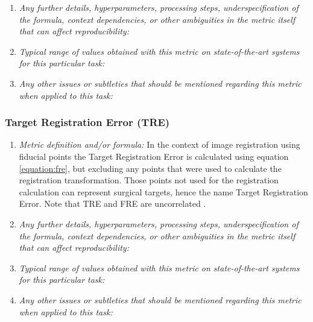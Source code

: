 \documentclass[a4paper,11pt]{article}
\begin{document}
\begin{enumerate}[label=\alph*.]
                \bigskip
                \item \textit{Any further details, hyperparameters, processing steps, underspecification of the formula, context dependencies, or other ambiguities in the metric itself that can affect reproducibility:}
                \bigskip
                \item \textit{Typical range of values obtained with this metric on state-of-the-art systems for this particular task:}
                \bigskip
                \item \textit{Any other issues or subtleties that should be mentioned regarding this metric when applied to this task:}
                \bigskip
            \end{enumerate}

        \subsubsection{Target Registration Error (TRE)}
            \begin{enumerate}[label=\alph*.]
                \item \textit{Metric definition and/or formula:}
                In the context of image registration using fiducial points the Target Registration Error is calculated using equation \ref{equation:fre}, but excluding any points that were used to calculate the registration transformation. Those points not used for the registration calculation can represent surgical targets, hence the name Target Registration Error. Note that TRE and FRE are uncorrelated \cite{fitzpatrick2009fiducial}.

                \bigskip
                \item \textit{Any further details, hyperparameters, processing steps, underspecification of the formula, context dependencies, or other ambiguities in the metric itself that can affect reproducibility:}
                \bigskip
                \item \textit{Typical range of values obtained with this metric on state-of-the-art systems for this particular task:}
                \bigskip
                \item \textit{Any other issues or subtleties that should be mentioned regarding this metric when applied to this task:}
                \bigskip
            \end{enumerate}
        
\end{document}
